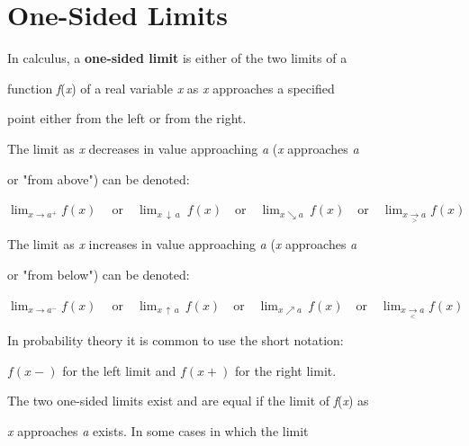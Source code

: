 \section{One-Sided Limits}
\label{sec:one-sided-limits}

In calculus, a \textbf{one-sided limit} is either of the two limits of a

function \textit{f}(\textit{x}) of a real variable \textit{x} as \textit{x} approaches a specified

point either from the left or from the right.






The limit as \textit{x} decreases in value approaching \textit{a} (\textit{x} approaches \textit{a}

or "from above") can be denoted:



$\lim_{x \to a^+}f(x)\ \quad \text{or} \quad  \lim_{x\ \downarrow\ a}\ f(x) \quad \text{or} \quad \lim_{x \searrow a}\,f(x) \quad \text{or} \quad \lim_{x \underset{>}{\to} a}f(x)$



The limit as \textit{x} increases in value approaching \textit{a} (\textit{x} approaches \textit{a}

or "from below") can be denoted:



$\lim_{x \to a^-}f(x)\ \quad \text{or} \quad \lim_{x\,\uparrow\,a}\, f(x) \quad \text{or} \quad \lim_{x \nearrow a}\,f(x) \quad \text{or} \quad \lim_{x \underset{<}{\to} a}f(x)$



In probability theory it is common to use the short notation:



$f(x-)$ for the left limit and $f(x+)$ for the right limit.



The two one-sided limits exist and are equal if the limit of \textit{f}(\textit{x}) as

\textit{x} approaches \textit{a} exists. In some cases in which the limit



